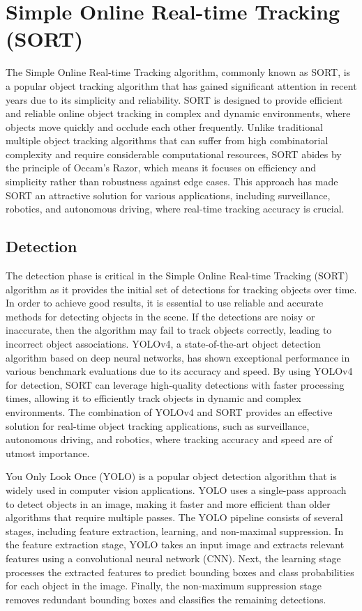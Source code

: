 \documentclass[11pt]{article}
\begin{document}
\section{Simple Online Real-time Tracking (SORT)}
The Simple Online Real-time Tracking algorithm, commonly known as SORT, is a popular object tracking algorithm that has gained significant attention in recent years due to its simplicity and reliability. SORT is designed to provide efficient and reliable online object tracking in complex and dynamic environments, where objects move quickly and occlude each other frequently. Unlike traditional multiple object tracking algorithms that can suffer from high combinatorial complexity and require considerable computational resources, SORT abides by the principle of Occam's Razor, which means it focuses on efficiency and simplicity rather than robustness against edge cases. This approach has made SORT an attractive solution for various applications, including surveillance, robotics, and autonomous driving, where real-time tracking accuracy is crucial.
	\subsection{Detection}
	The detection phase is critical in the Simple Online Real-time Tracking (SORT) algorithm as it provides the initial set of detections for tracking objects over time. In order to achieve good results, it is essential to use reliable and accurate methods for detecting objects in the scene.  If the detections are noisy or inaccurate, then the algorithm may fail to track objects correctly, leading to incorrect object associations. YOLOv4, a state-of-the-art object detection algorithm based on deep neural networks, has shown exceptional performance in various benchmark evaluations due to its accuracy and speed. By using YOLOv4 for detection, SORT can leverage high-quality detections with faster processing times, allowing it to efficiently track objects in dynamic and complex environments. The combination of YOLOv4 and SORT provides an effective solution for real-time object tracking applications, such as surveillance, autonomous driving, and robotics, where tracking accuracy and speed are of utmost importance.
\pagebreak	

	You Only Look Once (YOLO) is a popular object detection algorithm that is widely used in computer vision applications. YOLO uses a single-pass approach to detect objects in an image, making it faster and more efficient than older algorithms that require multiple passes. The YOLO pipeline consists of several stages, including feature extraction, learning, and non-maximal suppression. In the feature extraction stage, YOLO takes an input image and extracts relevant features using a convolutional neural network (CNN). Next, the learning stage processes the extracted features to predict bounding boxes and class probabilities for each object in the image. Finally, the non-maximum suppression stage removes redundant bounding boxes and classifies the remaining detections.
\end{document}
